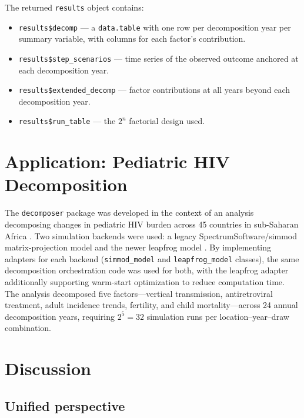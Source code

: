 \documentclass[11pt]{article}
\newcommand{\pkg}[1]{\texttt{#1}}
\newcommand{\code}[1]{\texttt{#1}}
\begin{document}
The returned \code{results} object contains:
\begin{itemize}
  \item \code{results\$decomp} --- a \code{data.table} with one row per
    decomposition year per summary variable, with columns for each
    factor's contribution.
  \item \code{results\$step\_scenarios} --- time series of the observed
    outcome anchored at each decomposition year.
  \item \code{results\$extended\_decomp} --- factor contributions at
    all years beyond each decomposition year.
  \item \code{results\$run\_table} --- the $2^n$ factorial design used.
\end{itemize}


\section{Application: Pediatric HIV Decomposition}
\label{sec:application}

The \pkg{decomposer} package was developed in the context of an
analysis decomposing changes in pediatric HIV burden across 45 countries
in sub-Saharan Africa \citep{carter2024pediatric}.
Two simulation backends were used: a legacy SpectrumSoftware/simmod
matrix-projection model and the newer leapfrog model
\citep{eaton2021naomi}.
By implementing adapters for each backend
(\code{simmod\_model} and \code{leapfrog\_model} classes), the same
decomposition orchestration code was used for both, with the leapfrog
adapter additionally supporting warm-start optimization to reduce
computation time.
The analysis decomposed five factors---vertical transmission,
antiretroviral treatment, adult incidence trends, fertility, and
child mortality---across 24 annual decomposition years, requiring
$2^5 = 32$ simulation runs per location--year--draw combination.


\section{Discussion}
\label{sec:discussion}

\subsection{Unified perspective}
\end{document}
